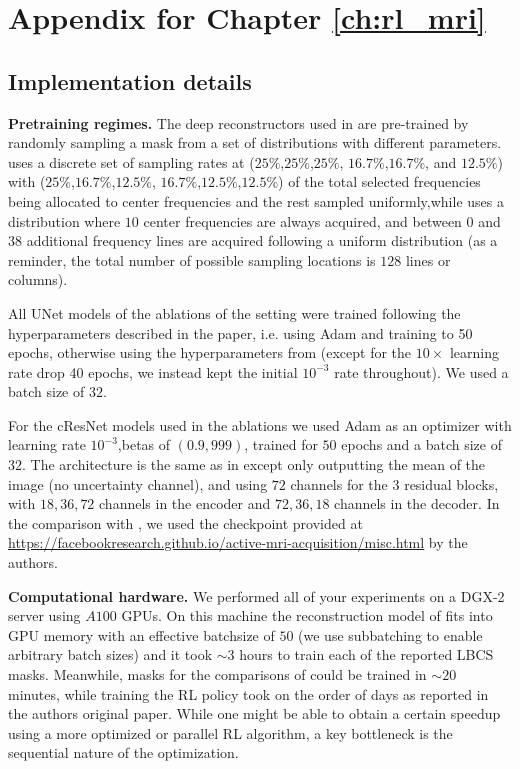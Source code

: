 \chapter{Appendix for Chapter \ref{ch:rl_mri}}


\section{Implementation details}\label{ap:implementation}
\textbf{Pretraining regimes.} The deep reconstructors used in \cite{pineda2020active,bakker2020experimental} are pre-trained by randomly sampling a mask from a set of distributions with different parameters. \cite{bakker2020experimental} uses a discrete set of sampling rates at ($25\%$,$25\%$,$25\%$, $16.7\%$,$16.7\%$, and $12.5\%$) with ($25\%$,$16.7\%$,$12.5\%$, $16.7\%$,$12.5\%$,$12.5\%$) of the total selected frequencies being allocated to center frequencies and the rest sampled uniformly,while  \cite{zhang2019reducing} uses a distribution  where $10$ center frequencies are always acquired, and between $0$ and $38$ additional frequency lines are acquired following a uniform distribution (as a reminder, the total number of possible sampling locations is $128$ lines or columns).

All UNet models of the ablations of the \citet{bakker2020experimental} setting were trained following the hyperparameters described in the paper, i.e. using Adam \citep{kingma2014adam} and training to 50 epochs, otherwise using the hyperparameters from \citet{zbontarFastMRIOpenDataset2019} (except for the $10\times$ learning rate drop 40 epochs, we instead kept the initial $10^{-3}$ rate throughout).
We used a batch size of $32$.

For the cResNet models used in the ablations we used Adam as an optimizer with learning rate $10^{-3}$,betas of $(0.9,999)$, trained for $50$ epochs and a batch size of $32$. The architecture is the same as in \citet{zhang2019reducing} except only outputting the mean of the image (no uncertainty channel), and using $72$ channels for the 3 residual blocks, with $18,36,72$ channels in the encoder and $72,36,18$ channels in the decoder. In the comparison with \citet{pineda2020active}, we used the checkpoint provided at \url{https://facebookresearch.github.io/active-mri-acquisition/misc.html} by the authors.


\textbf{Computational hardware.} We performed all of your experiments on a DGX-2 server using $A100$ GPUs. On this machine the reconstruction model of \cite{pineda2020active} fits into GPU memory with an effective batchsize of $50$ (we use subbatching to enable arbitrary batch sizes) and it took $\sim 3$ hours to train each of the reported LBCS masks. Meanwhile, masks for the comparisons of \cite{bakker2020experimental} could be trained in $\sim 20$ minutes, while training the RL policy took on the order of days as reported in the authors original paper.
While one might be able to obtain a certain speedup using a more optimized or parallel RL algorithm, a key bottleneck is the sequential nature of the optimization.

